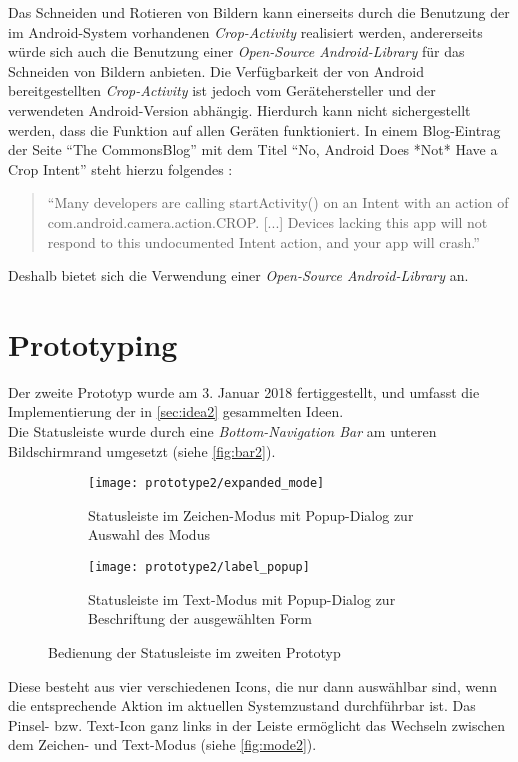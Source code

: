 Das Schneiden und Rotieren von Bildern kann einerseits durch die Benutzung der im Android-System vorhandenen \emph{Crop-Activity} realisiert werden, andererseits würde sich auch die Benutzung einer \emph{Open-Source Android-Library} für das Schneiden von Bildern anbieten.
Die Verfügbarkeit der von Android bereitgestellten \emph{Crop-Activity} ist jedoch vom Gerätehersteller und der verwendeten Android-Version abhängig.
Hierdurch kann nicht sichergestellt werden, dass die Funktion auf allen Geräten funktioniert.
In einem Blog-Eintrag der Seite ``The CommonsBlog'' mit dem Titel ``No, Android Does *Not* Have a Crop Intent'' steht hierzu folgendes \citep{Commonsware13}:
\begin{quote}
  ``Many developers are calling startActivity() on an Intent with an action of com.android.camera.action.CROP.
  [...] Devices lacking this app will not respond to this undocumented Intent action, and your app will crash.'' 
\end{quote}

\noindent
Deshalb bietet sich die Verwendung einer \emph{Open-Source Android-Library} an.

\section{Prototyping}
Der zweite Prototyp wurde am 3. Januar 2018 fertiggestellt, und umfasst die Implementierung der in \autoref{sec:idea2} gesammelten Ideen. \\

Die Statusleiste wurde durch eine \emph{Bottom-Navigation Bar} am unteren Bildschirmrand umgesetzt (siehe \autoref{fig:bar2}).
\begin{figure}[ht]
  \begin{subfigure}[t]{0.4\textwidth}
    \texttt{[image: prototype2/expanded\_mode]}
    \caption{Statusleiste im Zeichen-Modus mit Popup-Dialog zur Auswahl des Modus}
    \label{fig:mode2}
  \end{subfigure}
  \begin{subfigure}[t]{0.4\textwidth}
    \texttt{[image: prototype2/label\_popup]}
    \caption{Statusleiste im Text-Modus mit Popup-Dialog zur Beschriftung der ausgewählten Form}
    \label{fig:labelp2}
  \end{subfigure}
  \centering
  \caption{Bedienung der Statusleiste im zweiten Prototyp}
  \label{fig:bar2}
\end{figure}
Diese besteht aus vier verschiedenen Icons, die nur dann auswählbar sind, wenn die entsprechende Aktion im aktuellen Systemzustand durchführbar ist.
Das Pinsel- bzw. Text-Icon ganz links in der Leiste ermöglicht das Wechseln zwischen dem Zeichen- und Text-Modus (siehe \autoref{fig:mode2}). \\

